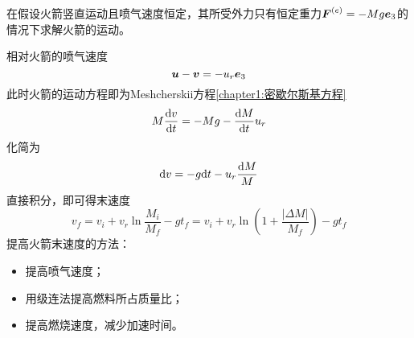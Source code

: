 \begin{example}[重力场中的火箭]
在假设火箭竖直运动且喷气速度恒定，其所受外力只有恒定重力$\boldsymbol{F}^{(e)} = -Mg\boldsymbol{e}_3$的情况下求解火箭的运动。
\end{example}
\begin{solution}
相对火箭的喷气速度
\begin{equation*}
	\boldsymbol{u}-\boldsymbol{v} = -u_r\boldsymbol{e}_3
\end{equation*}
此时火箭的运动方程即为Meshcherskii方程\eqref{chapter1:密歇尔斯基方程}
\begin{equation*}
	M\frac{\mathrm{d} v}{\mathrm{d} t} = -Mg - \dfrac{\mathrm{d} M}{\mathrm{d} t}u_r
\end{equation*}
化简为
\begin{equation*}
	\mathrm{d} v = -g\mathrm{d} t - u_r \frac{\mathrm{d} M}{M}
\end{equation*}
直接积分，即可得末速度
\begin{equation*}
	v_f = v_i + v_r \ln \frac{M_i}{M_f} - gt_f = v_i + v_r \ln \left(1+\frac{|\Delta M|}{M_f}\right) - gt_f
\end{equation*}
提高火箭末速度的方法：
\begin{itemize}
	\item 提高喷气速度；
	\item 用级连法提高燃料所占质量比；
	\item 提高燃烧速度，减少加速时间。
\end{itemize}
\end{solution}

